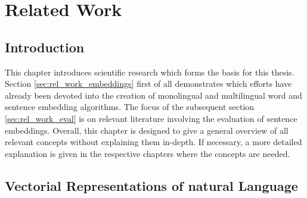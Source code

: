 %
%

\section{Related Work}
\label{sec:rel_work}

\vspace*{-1mm}
\subsection{Introduction}
\label{sec:rel_work_intro}

This chapter introduces scientific research which forms the basis for this thesis. Section \vref{sec:rel_work_embeddings} first of all demonstrates which efforts have already been devoted into the creation of monolingual and multilingual word and sentence embedding algorithms. The focus of the subsequent section \vref{sec:rel_work_eval} is on relevant literature involving the evaluation of sentence embeddings. Overall, this chapter is designed to give a general overview of all relevant concepts without explaining them in-depth. If necessary, a more detailed explanation is given in the respective chapters where the concepts are needed.

\subsection{Vectorial Representations of natural Language}
\label{sec:rel_work_embeddings}

